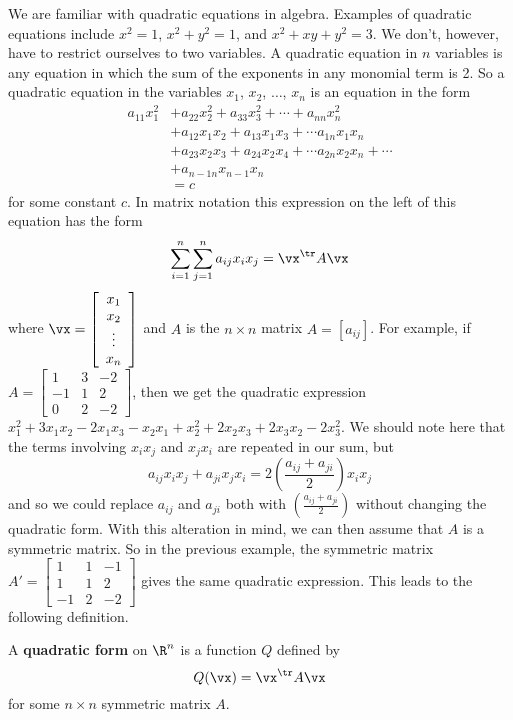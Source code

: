 We are familiar with quadratic equations in algebra. Examples of quadratic equations include $x^2=1$, $x^2+y^2=1$, and $x^2+xy+y^2=3$. We don't, however, have to restrict ourselves to two variables. A quadratic equation in $n$ variables is any equation in which the sum of the exponents in any monomial term is 2. So a quadratic equation in the variables $x_1$, $x_2$, $\ldots$, $x_n$ is an equation in the form
\begin{align*}
a_{11}x_1^2&+a_{22}x_2^2 + a_{33}x_3^2 + \cdots + a_{nn}x_n^2 \\
	&+ a_{12}x_1x_2 + a_{13}x_1x_3 + \cdots a_{1n}x_1x_n \\
	&+ a_{23}x_2x_3 + a_{24}x_2x_4 + \cdots a_{2n}x_2x_n + \cdots  \\
	&+ a_{n-1n}x_{n-1}x_n \\
	&= c
\end{align*}
for some constant $c$. In matrix notation this expression on the left of this equation has the form
\[\sum_{i=1}^{n} \sum_{j=1}^n a_{ij}x_ix_j = \vx^{\tr} A \vx\]
where $\vx = \left[ \begin{array}{c} x_1 \\ x_2 \\ \vdots \\ x_n \end{array} \right]$ and $A$ is the $n \times n$ matrix $A = [a_{ij}]$. For example, if $A= \left[ \begin{array}{rcr} 1&3&-2 \\ -1&1&2 \\ 0&2&-2\end{array} \right]$, then we get the quadratic expression $x_1^2+3x_1x_2-2x_1x_3-x_2x_1+x_2^2+2x_2x_3+2x_3x_2-2x_3^2$. We should note here that the terms involving $x_ix_j$ and $x_jx_i$ are repeated in our sum, but
\[a_{ij}x_ix_j + a_{ji}x_jx_i = 2\left(\frac{a_{ij} + a_{ji}}{2}\right)x_ix_j\]
and so we could replace $a_{ij}$ and $a_{ji}$ both with $\left(\frac{a_{ij} + a_{ji}}{2}\right)$ without changing the quadratic form. With this alteration in mind, we can then assume that $A$ is a symmetric matrix. So in the previous example, the symmetric matrix $A'= \left[ \begin{array}{rcr} 1&1&-1 \\ 1&1&2 \\ -1&2&-2\end{array}\right]$ gives the same quadratic expression. This leads to the following definition.


\begin{definition} A \textbf{quadratic form} on $\R^n$ is a function $Q$ defined by
\[Q(\vx) = \vx^{\tr} A \vx\]
for some $n \times n$ symmetric matrix $A$.
\end{definition}


